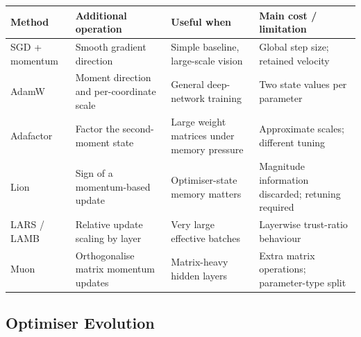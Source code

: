 \begin{center}
\small
\begin{tabularx}{.97\linewidth}{@{}L{.15\linewidth}L{.25\linewidth}YY@{}}
\toprule
\textbf{Method} & \textbf{Additional operation} & \textbf{Useful when} & \textbf{Main cost / limitation} \\
\midrule
SGD + momentum & Smooth gradient direction & Simple baseline, large-scale vision & Global step size; retained velocity \\
AdamW & Moment direction and per-coordinate scale & General deep-network training & Two state values per parameter \\
Adafactor & Factor the second-moment state & Large weight matrices under memory pressure & Approximate scales; different tuning \\
Lion & Sign of a momentum-based update & Optimiser-state memory matters & Magnitude information discarded; retuning required \\
LARS / LAMB & Relative update scaling by layer & Very large effective batches & Layerwise trust-ratio behaviour \\
Muon & Orthogonalise matrix momentum updates & Matrix-heavy hidden layers & Extra matrix operations; parameter-type split \\
\bottomrule
\end{tabularx}
\end{center}

\subsection{Optimiser Evolution}
\label{sec:optimisation-how-optimiser-ideas-evolved-a-branching-genealogy}


